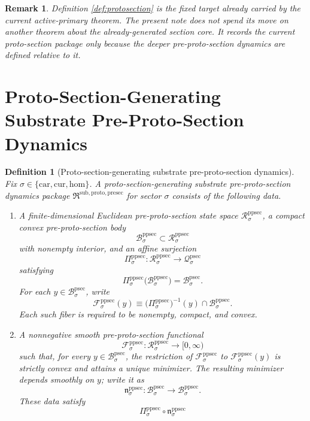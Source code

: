 \documentclass[11pt]{article}
\newcommand{\Car}{\mathrm{car}}
\newcommand{\Cur}{\mathrm{cur}}
\newcommand{\Hom}{\mathrm{hom}}
\newcommand{\ProtoSectionState}[1]{\mathcal Q_{#1}^{\mathrm{psec}}}
\newcommand{\ProtoSectionBody}[1]{\mathcal B_{#1}^{\mathrm{psec}}}
\newcommand{\PreProtoSectionPackage}{\mathfrak R^{\mathrm{sub,proto,presec}}}
\newcommand{\PreProtoSectionState}[1]{\mathcal R_{#1}^{\mathrm{ppsec}}}
\newcommand{\PreProtoSectionBody}[1]{\mathcal B_{#1}^{\mathrm{ppsec}}}
\newcommand{\PreProtoSectionProj}[1]{\Pi_{#1}^{\mathrm{ppsec}}}
\newcommand{\PreProtoSectionFiber}[2]{\mathcal F_{#1}^{\mathrm{ppsec}}(#2)}
\newcommand{\PreProtoSectionProtoMin}[1]{\mathfrak n_{#1}^{\mathrm{ppsec}}}
\newcommand{\PreProtoSectionFunctional}[1]{\mathscr F_{#1}^{\mathrm{ppsec}}}
\newtheorem{definition}{Definition}
\newtheorem{remark}{Remark}
\begin{document}
\begin{remark}
Definition \ref{def:protosection} is the fixed target already carried by the current active-primary theorem. The present note does not spend its move on another theorem about the already-generated section core. It records the current proto-section package only because the deeper pre-proto-section dynamics are defined relative to it.
\end{remark}

\section{Proto-Section-Generating Substrate Pre-Proto-Section Dynamics}

\begin{definition}[Proto-section-generating substrate pre-proto-section dynamics]
\label{def:preprotosection}
Fix \(\sigma\in\{\Car,\Cur,\Hom\}\). A \emph{proto-section-generating substrate pre-proto-section dynamics package} \(\PreProtoSectionPackage\) for sector \(\sigma\) consists of the following data.
\begin{enumerate}
    \item A finite-dimensional Euclidean pre-proto-section state space \(\PreProtoSectionState{\sigma}\), a compact convex pre-proto-section body
    \[
    \PreProtoSectionBody{\sigma}\subset\PreProtoSectionState{\sigma}
    \]
    with nonempty interior, and an affine surjection
    \[
    \PreProtoSectionProj{\sigma}:\PreProtoSectionState{\sigma}\to\ProtoSectionState{\sigma}
    \]
    satisfying
    \[
    \PreProtoSectionProj{\sigma}\bigl(\PreProtoSectionBody{\sigma}\bigr)=\ProtoSectionBody{\sigma}.
    \]
    For each \(y\in\ProtoSectionBody{\sigma}\), write
    \[
    \PreProtoSectionFiber{\sigma}{y}
    \equiv
    \bigl(\PreProtoSectionProj{\sigma}\bigr)^{-1}(y)\cap\PreProtoSectionBody{\sigma}.
    \]
    Each such fiber is required to be nonempty, compact, and convex.
    \item A nonnegative smooth pre-proto-section functional
    \[
    \PreProtoSectionFunctional{\sigma}:\PreProtoSectionState{\sigma}\to[0,\infty)
    \]
    such that, for every \(y\in\ProtoSectionBody{\sigma}\), the restriction of \(\PreProtoSectionFunctional{\sigma}\) to \(\PreProtoSectionFiber{\sigma}{y}\) is strictly convex and attains a unique minimizer. The resulting minimizer depends smoothly on \(y\); write it as
    \[
    \PreProtoSectionProtoMin{\sigma}:\ProtoSectionBody{\sigma}\to\PreProtoSectionBody{\sigma}.
    \]
    These data satisfy
    \[
    \PreProtoSectionProj{\sigma}\circ\PreProtoSectionProtoMin{\sigma}
\]
\end{enumerate}
\end{definition}
\end{document}

